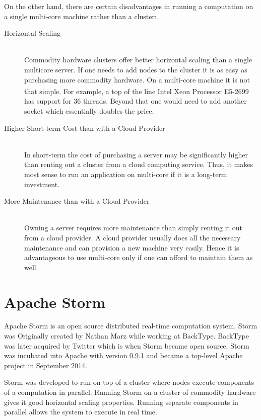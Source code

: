 \documentclass[bsc,logo,frontabs,twoside,singlespacing,normalheadings,parskip]{infthesis}\usepackage[]{graphicx}\usepackage[]{color}
\begin{document}
On the other hand, there are certain disadvantages in running a computation on a single multi-core machine rather than a cluster:

\begin{description}
	\item[Horizontal Scaling] \hfill \\
	Commodity hardware clusters offer better horizontal scaling than a single multicore server. If one needs to add nodes to the cluster it is as easy as purchasing more commodity hardware. On a multi-core machine it is not that simple. For example, a top of the line Intel\textsuperscript{\textregistered} Xeon\textsuperscript{\textregistered} Processor E5-2699 has support for 36 threads. Beyond that one would need to add another socket which essentially doubles the price.
	\item[Higher Short-term Cost than with a Cloud Provider] \hfill \\
	In short-term the cost of purchasing a server may be significantly higher than renting out a cluster from a cloud computing service. Thus, it makes most sense to run an application on multi-core if it is a long-term investment.
	\item[More Maintenance than with a Cloud Provider] \hfill \\
	Owning a server requires more maintenance than simply renting it out from a cloud provider. A cloud provider usually does  all the necessary maintenance and can provision a new machine very easily. Hence it is advantageous to use multi-core only if one can afford to maintain them as well.
\end{description}

\section{Apache Storm}
\label{sec:apache_storm}

Apache Storm is an open source distributed real-time computation system. Storm was Originally created by Nathan Marz while working at BackType. \cite{NathanAbout} BackType was later acquired by Twitter which is when Storm became open source. Storm was incubated into Apache with version 0.9.1 and became a top-level Apache project in September 2014.

Storm was developed to run on top of a cluster where nodes execute components of a computation in parallel. Running Storm on a cluster of commodity hardware gives it good horizontal scaling properties. Running separate components in parallel allows the system to execute in real time.
\end{document}
